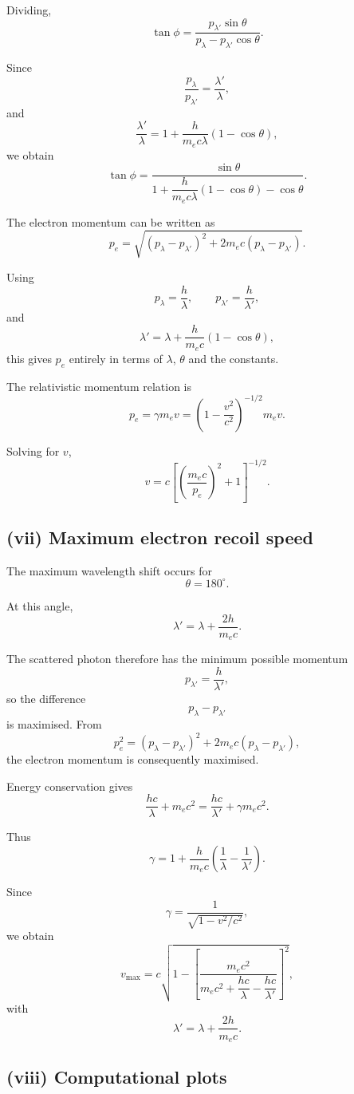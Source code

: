 \documentclass[11pt,a4paper]{article}
\begin{document}
Dividing,
\[
\tan\phi
=
\frac{p_{\lambda'}\sin\theta}
{p_\lambda-p_{\lambda'}\cos\theta}.
\]

Since
\[
\frac{p_\lambda}{p_{\lambda'}}
=
\frac{\lambda'}{\lambda},
\]
and
\[
\frac{\lambda'}{\lambda}
=
1+\frac{h}{m_ec\lambda}(1-\cos\theta),
\]
we obtain
\[
\boxed{
\tan\phi
=
\frac{\sin\theta}
{1+\dfrac{h}{m_ec\lambda}(1-\cos\theta)-\cos\theta}
}.
\]

The electron momentum can be written as
\[
\boxed{
p_e=
\sqrt{
(p_\lambda-p_{\lambda'})^2
+
2m_ec(p_\lambda-p_{\lambda'})
}
}.
\]

Using
\[
p_\lambda=\frac h\lambda,
\qquad
p_{\lambda'}=\frac h{\lambda'},
\]
and
\[
\lambda'
=
\lambda+
\frac{h}{m_ec}(1-\cos\theta),
\]
this gives $p_e$ entirely in terms of $\lambda$, $\theta$ and the constants.

The relativistic momentum relation is
\[
p_e=\gamma m_ev
=
\left(1-\frac{v^2}{c^2}\right)^{-1/2}m_ev.
\]

Solving for $v$,
\[
\boxed{
v
=
c\left[
\left(\frac{m_ec}{p_e}\right)^2+1
\right]^{-1/2}
}.
\]

\subsection{(vii) Maximum electron recoil speed}

The maximum wavelength shift occurs for
\[
\theta=180^\circ.
\]

At this angle,
\[
\lambda'
=
\lambda+\frac{2h}{m_ec}.
\]

The scattered photon therefore has the minimum possible momentum
\[
p_{\lambda'}=\frac h{\lambda'},
\]
so the difference
\[
p_\lambda-p_{\lambda'}
\]
is maximised. From
\[
p_e^2
=
(p_\lambda-p_{\lambda'})^2
+
2m_ec(p_\lambda-p_{\lambda'}),
\]
the electron momentum is consequently maximised.

Energy conservation gives
\[
\frac{hc}{\lambda}+m_ec^2
=
\frac{hc}{\lambda'}
+
\gamma m_ec^2.
\]

Thus
\[
\gamma
=
1+
\frac{h}{m_ec}
\left(
\frac1\lambda-\frac1{\lambda'}
\right).
\]

Since
\[
\gamma=\frac{1}{\sqrt{1-v^2/c^2}},
\]
we obtain
\[
\boxed{
v_{\max}
=
c\sqrt{
1-
\left[
\frac{m_ec^2}
{m_ec^2+\dfrac{hc}{\lambda}-\dfrac{hc}{\lambda'}}
\right]^2
}
},
\]
with
\[
\boxed{
\lambda'
=
\lambda+\frac{2h}{m_ec}
}.
\]

\subsection{(viii) Computational plots}
\end{document}
